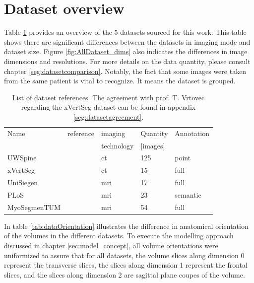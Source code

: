 \section{Dataset overview}
\par{
    Table \ref{tab:datasetReferences} provides an overview of the 5 datasets sourced for this work.
    This table shows there are significant differences between the datasets in imaging mode and dataset size.
    Figure \ref{fig:AllDataset_dims} also indicates the differences in image dimensions and resolutions.
    For more details on the data quantity, please consult chapter \ref{seg:datasetcomparison}. 
    Notably, the fact that some images were taken from the same patient is vital to recognize. It means the dataset is grouped. 
}
\begin{table}
 
    \begin{tabular}{ l l l l l} 
     \toprule
     Name & reference & imaging & Quantity & Annotation \\
          &           & technology & [images] & \\
     \hline 
    UWSpine & \cite{Glocker}  & \acrshort{ct} & 125 & point  \\ 
    xVertSeg & \cite{Ibragimov2014, Korez2015} & \acrshort{ct} & 15 & full \\
    UniSiegen  & \cite{Zukic2014} & \acrshort{mri} & 17 & full \\
    PLoS & \cite{Chu2015} & \acrshort{mri} & 23 & semantic \\
    MyoSegmenTUM & \cite{Burian2019} & \acrshort{mri} &  54 & full \\
     \bottomrule
    \end{tabular}
    \caption{List of dataset references. 
    The agreement with prof. T. Vrtovec regarding the xVertSeg dataset can be found in appendix \ref{seg:datasetagreement}.\label{tab:datasetReferences}}

\end{table}
\par{
    In table \ref{tab:dataOrientation} illustrates the difference in anatomical orientation of the volumes in the different datasets.
    To execute the modelling approach discussed in chapter \ref{sec:model_concept}, all volume orientations were uniformized to assure that for all datasets, the volume slices along dimension 0 represent the transverse slices, 
    the slices along dimension 1 represent the frontal slices, and the slices along dimension 2 are sagittal plane coupes of the volume.
}
